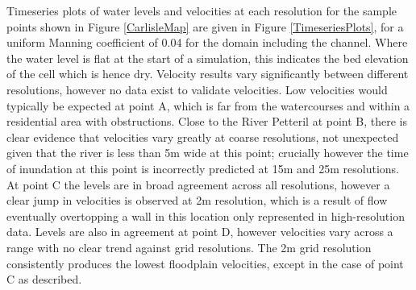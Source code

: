 \documentclass[11pt,english,a4paper]{article}
\begin{document}
Timeseries plots of water levels and velocities at each resolution for the sample points shown in Figure \ref{CarlisleMap} are given in Figure \ref{TimeseriesPlots}, for a uniform Manning coefficient of 0.04 for the domain including the channel. Where the water level is flat at the start of a simulation, this indicates the bed elevation of the cell which is hence dry. Velocity results vary significantly between different resolutions, however no data exist to validate velocities. Low velocities would typically be expected at point A, which is far from the watercourses and within a residential area with obstructions. Close to the River Petteril at point B, there is clear evidence that velocities vary greatly at coarse resolutions, not unexpected given that the river is less than 5m wide at this point; crucially however the time of inundation at this point is incorrectly predicted at 15m and 25m resolutions.  At point C the levels are in broad agreement across all resolutions, however a clear jump in velocities is observed at 2m resolution, which is a result of flow eventually overtopping a wall in this location only represented in high-resolution data. Levels are also in agreement at point D, however velocities vary across a range with no clear trend against grid resolutions. The 2m grid resolution consistently produces the lowest floodplain velocities, except in the case of point C as described.

\begin{table}[tpb]
\small
\centering
\caption{Simulation run-times for different devices, spatial resolutions and numerical precision (hh:mm:ss)}
\label{PerformanceResults}
\end{table}
\end{document}
